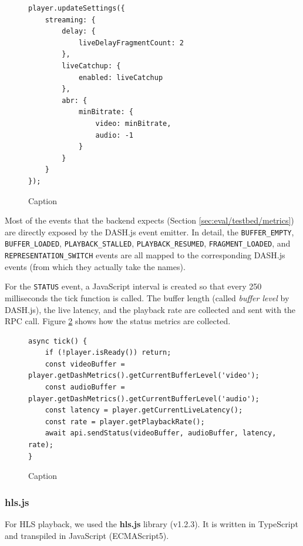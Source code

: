 \begin{figure}
    \centering
    \begin{verbatim}
player.updateSettings({
    streaming: {
        delay: {
            liveDelayFragmentCount: 2
        },
        liveCatchup: {
            enabled: liveCatchup
        },
        abr: {
            minBitrate: {
                video: minBitrate,
                audio: -1
            }
        }
    }
});
    \end{verbatim}
    \caption{Caption}
    \label{fig:dashjs_settings}
\end{figure}

Most of the events that the backend expects (Section \ref{sec:eval/testbed/metrics}) are directly exposed by the DASH.js event emitter. In detail, the \texttt{BUFFER\_EMPTY}, \texttt{BUFFER\_LOADED}, \texttt{PLAYBACK\_STALLED}, \texttt{PLAYBACK\_RESUMED}, \texttt{FRAGMENT\_LOADED}, and \texttt{REPRESENTATION\_SWITCH} events are all mapped to the corresponding DASH.js events (from which they actually take the names).

For the \texttt{STATUS} event, a JavaScript interval is created so that every 250 milliseconds the tick function is called. The buffer length (called \textit{buffer level} by DASH.js), the live latency, and the playback rate are collected and sent with the RPC call. Figure \ref{fig:dashjs_tick} shows how the status metrics are collected.

\begin{figure}
    \centering
    \begin{verbatim}
async tick() {
    if (!player.isReady()) return;
    const videoBuffer = player.getDashMetrics().getCurrentBufferLevel('video');
    const audioBuffer = player.getDashMetrics().getCurrentBufferLevel('audio');
    const latency = player.getCurrentLiveLatency();
    const rate = player.getPlaybackRate();
    await api.sendStatus(videoBuffer, audioBuffer, latency, rate);
}
    \end{verbatim}
    \caption{Caption}
    \label{fig:dashjs_tick}
\end{figure}

\subsubsection{hls.js}
\label{sec:eval/testbed/frontend/hlsjs}

For HLS playback, we used the \textbf{hls.js} library (v1.2.3). It is written in TypeScript and transpiled in JavaScript (ECMAScript5).

